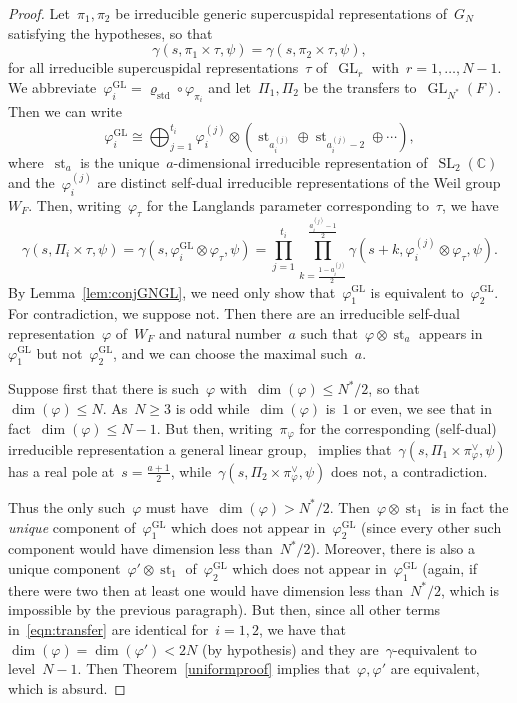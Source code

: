 \documentclass[12pt]{amsart}
\newcommand{\BC}{\mathbb {C}}
\newcommand{\GL}{\operatorname{GL}}
\newcommand{\SL}{\operatorname{SL}}
\newcommand{\st}{\operatorname{st}}
\def\rhostd{\varrho_{\mathrm{std}}} %
\begin{document}
\begin{proof}
Let~$\pi_1,\pi_2$ be irreducible generic supercuspidal representations of~$G_N$ satisfying the hypotheses, so that
\[
\gamma(s, \pi_1 \times \tau, \psi) = \gamma(s, \pi_2 \times \tau, \psi),
\]
for all irreducible supercuspidal representations~$\tau$ of~$\GL_r$ with~$r = 1, \ldots, N-1$. We abbreviate~$\varphi_i^{\GL}=\rhostd\circ\varphi_{\pi_i}$ and let~$\Pi_1,\Pi_2$ be the transfers to~$\GL_{N^*}(F)$. Then we can write
\[
\varphi_i^{\GL} \cong \bigoplus_{j=1}^{t_i} \varphi_i^{(j)}\otimes\left(\st_{a_i^{(j)}}\oplus\st_{a_i^{(j)}-2}\oplus\cdots\right),
\] 
where~$\st_a$ is the unique~$a$-dimensional irreducible representation of~$\SL_2(\BC)$ and the~$\varphi_i^{(j)}$ are distinct self-dual irreducible representations of the Weil group~$W_F$. Then, writing~$\varphi_\tau$ for the Langlands parameter corresponding to~$\tau$, we have
\begin{equation}\label{eqn:transfer}
\gamma(s,\Pi_i\times \tau,\psi) = \gamma(s,\varphi_i^{\GL}\otimes \varphi_\tau,\psi) = \prod_{j=1}^{t_i} \prod_{k=\frac{1-a_i^{(j)}}2}^{\frac{a_i^{(j)}-1}2} \gamma(s+k,\varphi_i^{(j)}\otimes\varphi_\tau,\psi).
\end{equation}
By Lemma~\ref{lem:conjGNGL}, we need only show that~$\varphi_1^{\GL}$ is equivalent to~$\varphi_2^{\GL}$. For contradiction, we suppose not. Then there are an irreducible self-dual representation~$\varphi$ of~$W_F$ and natural number~$a$ such that~$\varphi\otimes\st_a$ appears in~$\varphi_1^{\GL}$ but not~$\varphi_2^{\GL}$, and we can choose the maximal such~$a$. 

Suppose first that there is such~$\varphi$ with~$\dim(\varphi)\le N^*/2$, so that~$\dim(\varphi)\le N$. As~$N\ge 3$ is odd while~$\dim(\varphi)$ is~$1$ or even, we see that in fact~$\dim(\varphi)\le N-1$. But then, writing~$\pi_\varphi$ for the corresponding (self-dual) irreducible representation a general linear group,~\cite[Proposition~2.9]{JNS15} implies that~$\gamma(s,\Pi_1\times \pi_\varphi^\vee,\psi)$ has a real pole at~$s=\frac{a+1}2$, while~$\gamma(s,\Pi_2\times \pi_\varphi^\vee,\psi)$ does not, a contradiction.

Thus the only such~$\varphi$ must have~$\dim(\varphi)> N^*/2$. Then~$\varphi\otimes\st_1$ is in fact the \emph{unique} component of~$\varphi_1^{\GL}$ which does not appear in~$\varphi_2^{\GL}$ (since every other such component would have dimension less than~$N^*/2$). Moreover, there is also a unique component~$\varphi'\otimes\st_1$ of~$\varphi_2^{\GL}$ which does not appear in~$\varphi_1^{\GL}$ (again, if there were two then at least one would have dimension less than~$N^*/2$, which is impossible by the previous paragraph). But then, since all other terms in~\eqref{eqn:transfer} are identical for~$i=1,2$, we have that~$\dim(\varphi)=\dim(\varphi')< 2N$ (by hypothesis) and they are~$\gamma$-equivalent to level~$N-1$. Then Theorem~\ref{uniformproof} implies that~$\varphi,\varphi'$ are equivalent, which is absurd.
\end{proof}
\end{document}
